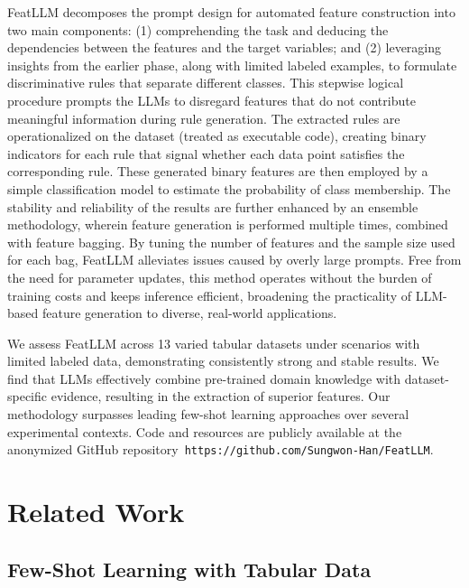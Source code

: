 \textsf{FeatLLM} decomposes the prompt design for automated feature construction into two main components: (1) comprehending the task and deducing the dependencies between the features and the target variables; and (2) leveraging insights from the earlier phase, along with limited labeled examples, to formulate discriminative rules that separate different classes. This stepwise logical procedure prompts the LLMs to disregard features that do not contribute meaningful information during rule generation. The extracted rules are operationalized on the dataset (treated as executable code), creating binary indicators for each rule that signal whether each data point satisfies the corresponding rule. These generated binary features are then employed by a simple classification model to estimate the probability of class membership. The stability and reliability of the results are further enhanced by an ensemble methodology, wherein feature generation is performed multiple times, combined with feature bagging. By tuning the number of features and the sample size used for each bag, \textsf{FeatLLM} alleviates issues caused by overly large prompts. Free from the need for parameter updates, this method operates without the burden of training costs and keeps inference efficient, broadening the practicality of LLM-based feature generation to diverse, real-world applications.

We assess \textsf{FeatLLM} across 13 varied tabular datasets under scenarios with limited labeled data, demonstrating consistently strong and stable results. We find that LLMs effectively combine pre-trained domain knowledge with dataset-specific evidence, resulting in the extraction of superior features. Our methodology surpasses leading few-shot learning approaches over several experimental contexts. Code and resources are publicly available at the anonymized GitHub repository~\texttt{https://github.com/Sungwon-Han/FeatLLM}.

\section{Related Work}

\subsection{Few-Shot Learning with Tabular Data} 

